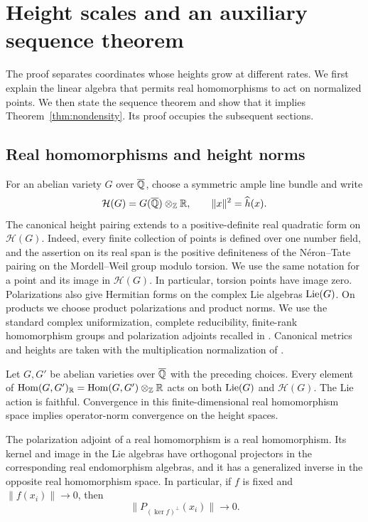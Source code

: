 \section{Height scales and an auxiliary sequence theorem}
\label{sec:sequences}

The proof separates coordinates whose heights grow at different rates.
We first explain the linear algebra that permits real homomorphisms to act
on normalized points. We then state the sequence theorem and show that it
implies Theorem~\ref{thm:nondensity}. Its proof occupies the subsequent
sections.

\subsection{Real homomorphisms and height norms}

For an abelian variety $G$ over $\overline{\mathbb Q}$, choose a symmetric ample line
bundle and write
\[
 \mathcal H(G)=G(\overline{\mathbb Q})\otimes_{\mathbb Z}\mathbb R,
 \qquad \|x\|^2=\widehat h(x).
\]
The canonical height pairing extends to a positive-definite real
quadratic form on $\mathcal H(G)$. Indeed, every finite collection of
points is defined over one number field, and the assertion on its real
span is the positive definiteness of the N\'eron--Tate pairing on the
Mordell--Weil group modulo torsion. We use the same notation for a point
and its image in $\mathcal H(G)$. In particular, torsion points have image
zero. Polarizations also give Hermitian forms on the complex Lie algebras
$\operatorname{Lie}(G)$. On products we choose product polarizations and product norms.
We use the standard complex uniformization, complete reducibility,
finite-rank homomorphism groups and polarization adjoints recalled in
\cite[Chapter~I, Sections~2, 10 and 14]{Milne2008AV}. Canonical metrics
and heights are taken with the multiplication normalization of
\cite[Theorem~2.2]{Zhang1995}.

\begin{lemma}
\label{lemma:real-calculus}
Let $G,G'$ be abelian varieties over $\overline{\mathbb Q}$ with the preceding choices.
Every element of
$\operatorname{Hom}(G,G')_{\mathbb R}=\operatorname{Hom}(G,G')\otimes_{\mathbb Z}\mathbb R$
acts on both $\operatorname{Lie}(G)$ and $\mathcal H(G)$. The Lie action is faithful.
Convergence in this finite-dimensional real homomorphism space implies
operator-norm convergence on the height spaces.

The polarization adjoint of a real homomorphism is a real homomorphism.
Its kernel and image in the Lie algebras have orthogonal projectors in
the corresponding real endomorphism algebras, and it has a generalized
inverse in the opposite real homomorphism space. In particular, if $f$
is fixed and $\|f(x_i)\|\to0$, then
\[
 \|P_{(\ker f)^\perp}(x_i)\|\longrightarrow0.
\]
\end{lemma}

